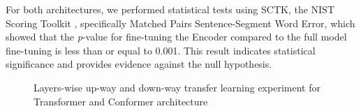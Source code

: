 For both architectures, we performed statistical tests using SCTK, the NIST Scoring Toolkit \cite{SCTK_nist}, specifically Matched Pairs Sentence-Segment Word Error, which showed that the \textit{p}-value for fine-tuning the Encoder compared to the full model fine-tuning is less than or equal to 0.001. This result indicates statistical significance and provides evidence against the null hypothesis.

\begin{figure}
    \centering
    \caption{Layers-wise up-way and down-way transfer learning experiment for Transformer and Conformer architecture}
    \label{fig:layerWISE}
\end{figure}


